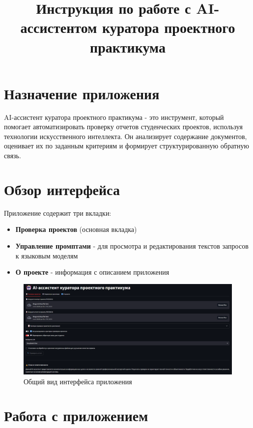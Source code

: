 \documentclass[a4paper,12pt]{article}
\title{Инструкция по работе с AI-ассистентом куратора проектного практикума}
\author{}
\date{}
\begin{document}
\maketitle
\tableofcontents
\newpage

\section{Назначение приложения}
AI-ассистент куратора проектного практикума - это инструмент, который помогает автоматизировать проверку отчетов студенческих проектов, используя технологии искусственного интеллекта. Он анализирует содержание документов, оценивает их по заданным критериям и формирует структурированную обратную связь.

\section{Обзор интерфейса}

\begin{samepage}
Приложение содержит три вкладки:
\begin{itemize}
    \item \textbf{Проверка проектов} (основная вкладка)
    \item \textbf{Управление промптами} - для просмотра и редактирования текстов запросов к языковым моделям
    \item \textbf{О проекте} - информация с описанием приложения
\end{itemize}
\end{samepage}

\begin{figure}[!htb]
    \centering
    \includegraphics[width=\linewidth]{assets/interface.png}
    \caption{Общий вид интерфейса приложения}
\end{figure}

\FloatBarrier
\section{Работа с приложением}
\end{document}
